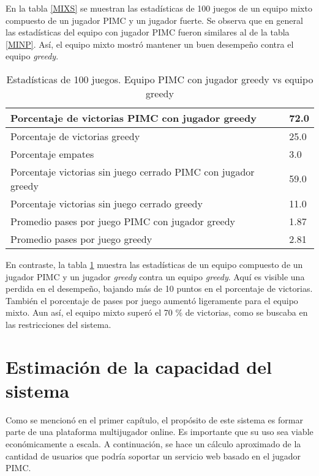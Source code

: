 En la tabla \ref{MIXS} se muestran las estadísticas de 100 juegos de un equipo
mixto compuesto de un jugador PIMC y un jugador fuerte. Se observa que en
general las estadísticas del equipo con jugador PIMC fueron similares al de la
tabla \ref{MINP}. Así, el equipo mixto mostró mantener un buen desempeño contra
el equipo \textit{greedy}.


\begin{table}[!ht]
    \centering
    \small
    \caption{Estadísticas de 100 juegos. Equipo PIMC con jugador greedy vs equipo greedy}
    \begin{tabular}{|l|l|}
    \hline
        Porcentaje de victorias PIMC con jugador greedy & 72.0 \\ \hline
        Porcentaje de victorias greedy & 25.0 \\ \hline
        Porcentaje empates & 3.0 \\ \hline
        Porcentaje victorias sin juego cerrado PIMC con jugador greedy & 59.0 \\ \hline
        Porcentaje victorias sin juego cerrado greedy & 11.0 \\ \hline
        Promedio pases por juego PIMC con jugador greedy & 1.87 \\ \hline
        Promedio pases por juego greedy & 2.81 \\ \hline
    \end{tabular}
    \label{MIXG}
\end{table}

En contraste, la tabla \ref{MIXG} muestra las estadísticas de un equipo
compuesto de un jugador PIMC y un jugador \textit{greedy} contra un equipo
\textit{greedy}. Aquí es visible una perdida en el desempeño, bajando más de 10
puntos en el porcentaje de victorias. También el porcentaje de pases por juego
aumentó ligeramente para el equipo mixto. Aun así, el equipo mixto superó el 70
\% de victorias, como se buscaba en las restricciones del sistema.

\section{Estimación de la capacidad del sistema}

Como se mencionó en el primer capítulo, el propósito de este sistema es formar
parte de una plataforma multijugador online. Es importante que su uso sea viable
económicamente a escala. A continuación, se hace un cálculo aproximado de la
cantidad de usuarios que podría soportar un servicio web basado en el jugador
PIMC.

